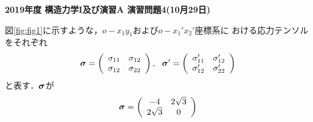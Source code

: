 \documentclass[10pt,a4j]{jarticle}
\newlength{\minitwocolumn}
\begin{document}
\newcommand{\fat}[1]{\mbox{\boldmath $#1$}}
\newcommand{\D}{\partial}
\newcommand{\w}{\omega}
\newcommand{\ga}{\alpha}
\newcommand{\gb}{\beta}
\newcommand{\gx}{\xi}
\newcommand{\gz}{\zeta}
\newcommand{\vhat}[1]{\hat{\fat{#1}}}
\newcommand{\spc}{\vspace{0.7\baselineskip}}
\newcommand{\halfspc}{\vspace{0.3\baselineskip}}

\pagestyle{empty}
\newcommand{\twofig}[2]
 {
   \begin{figure}[here]
     \begin{minipage}[t]{\minitwocolumn}
         \begin{center}   #1
         \end{center}
     \end{minipage}
         \hspace{\columnsep}
     \begin{minipage}[t]{\minitwocolumn}
         \begin{center} #2
         \end{center}
     \end{minipage}
   \end{figure}
 }
\begin{center}
{\Large \bf 2019年度 構造力学I及び演習A 演習問題4(10月29日)} \\
\end{center}
\vspace{15mm}
	図\ref{fig:fig1}に示すような，$o-x_1 y_1$および$o-x_1'x_2'$座標系に
	おける応力テンソルをそれぞれ
\[
	\fat{\sigma}
	=
	\left( 
		\begin{array}{cc}
		\sigma_{11} & \sigma_{12} \\
		\sigma_{12} & \sigma_{22} 
		\end{array}
	\right)
	, 
	\ \
	\fat{\sigma}'
	=
	\left( 
		\begin{array}{cc}
		\sigma_{11}' & \sigma_{12}' \\
		\sigma_{12}' & \sigma_{22}'
		\end{array}
	\right)
\]
	と表す．$\fat{\sigma}$が
\begin{equation}
	\fat{\sigma}
	=
	\left( 
		\begin{array}{cc}
		-4 & 2\sqrt{3} \\
		2\sqrt{3} & 0 
		\end{array}
	\right)
	\label{eqn:sigma}
\end{equation}
\end{document}
